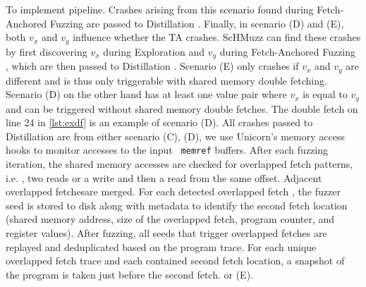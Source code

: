 \documentclass[conference]{IEEEtran} %
\newcommand{\sysname}{ScHMuzz\xspace}
\newcommand{\stageone}{Exploration\xspace}
\newcommand{\stagetwo}{Fetch-Anchored Fuzzing\xspace} %
\newcommand{\stagethree}{Distillation\xspace}
\providecommand{\DIFaddtex}[1]{{\protect\color{blue} \sf #1}} %
\providecommand{\DIFdeltex}[1]{{\protect\color{red} \scriptsize #1}} %
\providecommand{\DIFaddbegin}{} %
\providecommand{\DIFaddend}{} %
\providecommand{\DIFdelbegin}{} %
\providecommand{\DIFdelend}{} %
\providecommand{\DIFadd}[1]{\texorpdfstring{\DIFaddtex{#1}}{#1}} %
\providecommand{\DIFdel}[1]{\texorpdfstring{\DIFdeltex{#1}}{}} %
\begin{document}
\DIFdel{To implement }\DIFdelend \DIFaddbegin \DIFadd{pipeline. Crashes arising from this scenario found during 
}\stagetwo \DIFadd{are passed to }\stagethree\DIFadd{. 
Finally, in scenario (D) and (E), both $v_x$ and $v_y$ influence whether the TA crashes. 
}\sysname \DIFadd{can find these crashes by first discovering $v_x$ during }\DIFaddend \stageone \DIFaddbegin \DIFadd{and $v_y$ 
during }\stagetwo\DIFadd{, which are then passed to }\stagethree\DIFadd{. 
Scenario (E) only crashes if $v_x$ and $v_y$ are different and is thus only triggerable 
with shared memory double fetching. 
Scenario (D) on the other hand 
has at least one value pair where $v_x$ is equal to $v_y$ and can be triggered without 
shared memory double fetches. The double fetch on line 24 in }\autoref{lst:exdf} 
\DIFadd{is an example of scenario (D).
All crashes passed to }\stagethree 
\DIFadd{are from either scenario (C), (D)}\DIFaddend , \DIFdelbegin \DIFdel{we use Unicorn's memory access hooks to monitor accesses to the input }\texttt{\DIFdel{memref}} %
\DIFdel{buffers. 
After each fuzzing iteration, the shared memory accesses are checked for overlapped fetch patterns, i.e. 
, 
two reads or a write and then a read from the same offset. Adjacent overlapped fetchesare merged. For each detected overlapped fetch , the fuzzer seed is stored 
to disk along with metadata to identify the second fetch location (shared memory address, size of the overlapped fetch, 
program counter, and register values). 
After fuzzing, all seeds that trigger overlapped fetches are replayed and deduplicated 
based on the program trace. 
For each unique overlapped fetch trace and each contained second fetch location, 
a snapshot of the program is taken just before the second fetch. }\DIFdelend \DIFaddbegin \DIFadd{or (E). 
}\DIFaddend 
\end{document}
